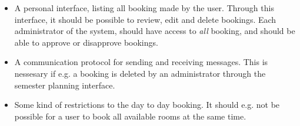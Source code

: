 \begin{itemize}
	\item A personal interface, listing all booking made by the user. Through this interface, it should be possible to review, edit and delete bookings. Each administrator of the system, should have access to \emph{all} booking, and should be able to approve or disapprove bookings.
	\item A communication protocol for sending and receiving messages. This is nessesary if e.g. a booking is deleted by an administrator through the semester planning interface.
	\item Some kind of restrictions to the day to day booking. It should e.g. not be possible for a user to book all available rooms at the same time.
\end{itemize}